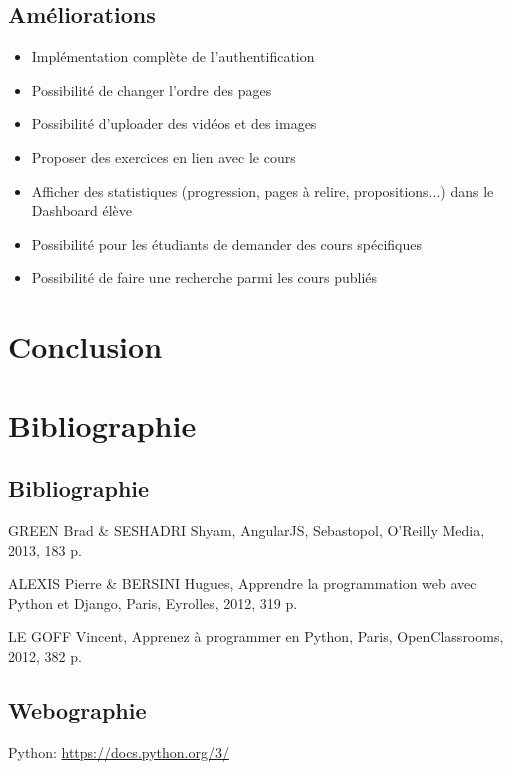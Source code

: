\documentclass[a4paper,10pt,twoside]{sphinxmanual}
\begin{document}
\section{Améliorations}
\label{bugs:ameliorations}\begin{itemize}
\item {} 
Implémentation complète de l'authentification

\item {} 
Possibilité de changer l'ordre des pages

\item {} 
Possibilité d'uploader des vidéos et des images

\item {} 
Proposer des exercices en lien avec le cours

\item {} 
Afficher des statistiques (progression, pages à relire, propositions...) dans le Dashboard élève

\item {} 
Possibilité pour les étudiants de demander des cours spécifiques

\item {} 
Possibilité de faire une recherche parmi les cours publiés

\end{itemize}


\chapter{Conclusion}
\label{conclusion::doc}\label{conclusion:conclusion}

\chapter{Bibliographie}
\label{bibliographie:bibliographie}\label{bibliographie::doc}

\section{Bibliographie}
\label{bibliographie:id1}
GREEN Brad \& SESHADRI Shyam, AngularJS, Sebastopol, O’Reilly Media, 2013, 183 p.

ALEXIS Pierre \& BERSINI Hugues, Apprendre la programmation web avec Python et Django, Paris, Eyrolles, 2012, 319 p.

LE GOFF Vincent, Apprenez à programmer en Python, Paris, OpenClassrooms, 2012, 382 p.


\section{Webographie}
\label{bibliographie:webographie}
Python: \href{https://docs.python.org/3/}{https://docs.python.org/3/}
\end{document}
